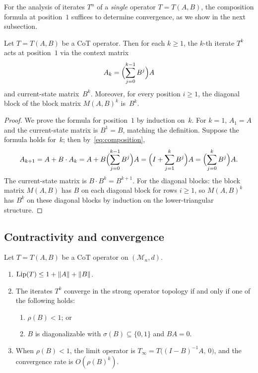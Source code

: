 For the analysis of iterates $T^n$ of a \emph{single} operator $T=T(A,B)$,
the composition formula at position~$1$ suffices to determine convergence, as
we show in the next subsection.

\begin{lemma}\label{lem:iterate}
  Let $T=T(A,B)$ be a CoT operator. Then for each $k\geq 1$, the $k$-th
  iterate $T^k$ acts at position~$1$ via the context matrix
  \begin{equation}\label{eq:Ak}
    A_k = \Bigl(\sum_{j=0}^{k-1}B^j\Bigr)A
  \end{equation}
  and current-state matrix~$B^k$. Moreover, for every position $i\geq 1$,
  the diagonal block of the block matrix $M(A,B)^k$ is~$B^k$.
\end{lemma}

\begin{proof}
  We prove the formula for position~$1$ by induction on~$k$. For $k=1$,
  $A_1=A$ and the current-state matrix is $B^1=B$, matching the definition.
  Suppose the formula holds for~$k$; then by~\eqref{eq:composition},
  \[
    A_{k+1} = A + B\cdot A_k = A + B\Bigl(\sum_{j=0}^{k-1}B^j\Bigr)A
    = \Bigl(I+\sum_{j=1}^{k}B^j\Bigr)A
    = \Bigl(\sum_{j=0}^{k}B^j\Bigr)A.
  \]
  The current-state matrix is $B\cdot B^k=B^{k+1}$. For the diagonal blocks:
  the block matrix $M(A,B)$ has $B$ on each diagonal block for rows $i\geq 1$,
  so $M(A,B)^k$ has $B^k$ on these diagonal blocks by induction on the
  lower-triangular structure.
\end{proof}

\subsection{Contractivity and convergence}

\begin{theorem}\label{thm:contractivity}
  Let $T=T(A,B)$ be a CoT operator on $(\mathcal{M}_n,d)$.
  \begin{enumerate}[label=\textup{(\alph*)}]
    \item $\operatorname{Lip}(T)\leq 1+\|A\|+\|B\|$.
    \item The iterates $T^k$ converge in the strong operator topology if and
      only if one of the following holds:
      \begin{enumerate}[label=\textup{(\roman*)}]
        \item $\rho(B)<1$; or
        \item $B$ is diagonalizable with $\sigma(B)\subseteq\{0,1\}$ and
          $BA=0$.
      \end{enumerate}
    \item When $\rho(B)<1$, the limit operator is
      $T_\infty=T\bigl((I-B)^{-1}A,\,0\bigr)$, and the convergence rate is
      $O(\rho(B)^k)$.
  \end{enumerate}
\end{theorem}

